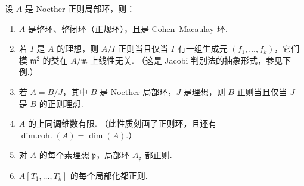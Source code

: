 \begin{theorem}\label{item:ag-3-1-10}
设 $A$ 是 Noether 正则局部环，则：
\begin{enumerate}[label=\roman*)]
\item $A$ 是整环、整闭环（正规环），且是 Cohen--Macaulay 环.
\item 若 $I$ 是 $A$ 的理想，则 $A/I$ 正则当且仅当 $I$ 有一组生成元 $(f_1,\ldots,f_k)$，它们模 $\mathfrak m^2$ 的类在 $A/\mathfrak m$ 上线性无关. （这是 Jacobi 判别法的抽象形式，参见下例.）
\item 若 $A=B/J$，其中 $B$ 是 Noether 局部环，$J$ 是理想，则 $B$ 正则当且仅当 $J$ 是 $B$ 的正则理想.
\item $A$ 的上同调维数有限. （此性质刻画了正则环，且还有 $\operatorname{dim.coh.}(A)=\dim(A)$.）
\item 对 $A$ 的每个素理想 $\mathfrak p$，局部环 $A_{\mathfrak p}$ 都正则.
\item $A[T_1,\ldots,T_k]$ 的每个局部化都正则.
\end{enumerate}
\end{theorem}
